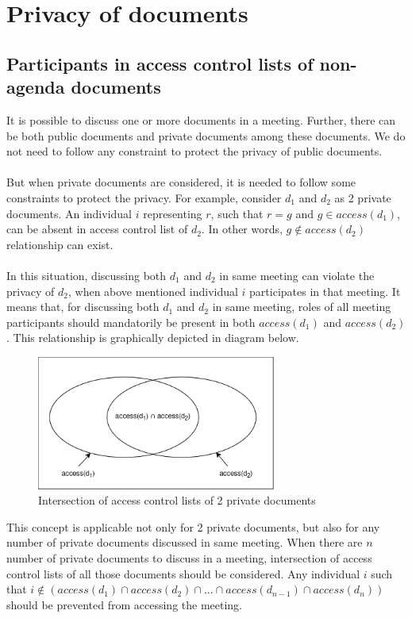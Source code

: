 \documentclass{article}
\begin{document}
\section{Privacy of documents}
\subsection{Participants in access control lists of non-agenda documents}
\noindent
It is possible to discuss one or more documents in a meeting. Further, there can be both public documents and private documents among these documents. We do not need to follow any constraint to protect the privacy of public documents.\\ \\
But when private documents are considered, it is needed to follow some constraints to protect the privacy. For example, consider $d_{1}$ and $d_{2}$ as 2 private documents. An individual $i$ representing $r$, such that $r = g$ and $g \in access(d_{1})$, can be absent in access control list of $d_{2}$. In other words, $g \notin access(d_{2})$ relationship can exist.\\ \\
In this situation, discussing both $d_{1}$ and $d_{2}$ in same meeting can violate the privacy of $d_{2}$, when above mentioned individual $i$ participates in that meeting. It means that, for discussing both $d_{1}$ and $d_{2}$ in same meeting, roles of all meeting participants should mandatorily be present in both $access(d_{1})$ and $access(d_{2})$. This relationship is graphically depicted in diagram below.
\begin{figure}[H]
    \centering
    \includegraphics[width=0.7\textwidth]{./image/d1_intersection_d2.png}
    \caption{Intersection of access control lists of 2 private documents}
    \label{fig:intersection of access control lists of 2 private documents}
\end{figure} 
\noindent
This concept is applicable not only for 2 private documents, but also for any number of private documents discussed in same meeting. When there are $n$ number of private documents to discuss in a meeting, intersection of access control lists of all those documents should be considered. Any individual $i$ such that $i \notin (access(d_{1}) \cap access(d_{2}) \cap ... \cap access(d_{n-1}) \cap access(d_{n}))$ should be prevented from accessing the meeting.
\end{document}
